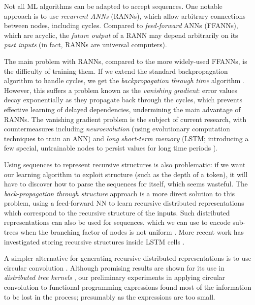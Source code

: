 Not all ML algorithms can be adapted to accept sequences. One notable approach
is to use \emph{recurrent ANNs} (RANNs), which allow arbitrary connections
between nodes, including cycles. Compared to \emph{feed-forward} ANNs (FFANNs),
which are acyclic, the \emph{future output} of a RANN may depend arbitrarily on
its \emph{past inputs} (in fact, RANNs are universal computers).

The main problem with RANNs, compared to the more widely-used FFANNs, is the
difficulty of training them. If we extend the standard backpropagation algorithm
to handle cycles, we get the \emph{backpropagation through time} algorithm
\cite{werbos1990backpropagation}. However, this suffers a problem known as the
\emph{vanishing gradient}: error values decay exponentially as they propagate
back through the cycles, which prevents effective learning of delayed
dependencies, undermining the main advantage of RANNs. The vanishing gradient
problem is the subject of current research, with countermeasures including
\emph{neuroevolution} (using evolutionary computation techniques to train an
ANN) and \emph{long short-term memory} (LSTM; introducing a few special,
untrainable nodes to persist values for long time periods
\cite{hochreiter1997long}).

Using sequences to represent recursive structures is also problematic: if we
want our learning algorithm to exploit structure (such as the depth of a token),
it will have to discover how to parse the sequences for itself, which seems
wasteful. The \emph{back-propagation through structure} approach
\cite{goller1996learning} is a more direct solution to this problem, using a
feed-forward NN to learn recursive distributed representations
\cite{pollack1990recursive} which correspond to the recursive structure of the
inputs. Such distributed representations can also be used for sequences, which
we can use to encode sub-trees when the branching factor of nodes is not uniform
\cite{kwasny1995tail}. More recent work has investigated storing recursive
structures inside LSTM cells \cite{zhu2015long}.

A simpler alternative for generating recursive distributed representations is to
use circular convolution \cite{conf/ijcai/Plate91}. Although promising results
are shown for its use in \emph{distributed tree kernels}
\cite{zanzotto2012distributed}, our preliminary experiments in applying
circular convolution to functional programming expressions found most of the
information to be lost in the process; presumably as the expressions are too
small.

